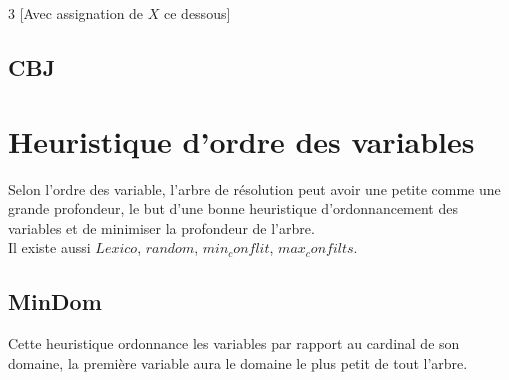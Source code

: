 \begin{multicols}{3}
[Avec assignation de $X$ ce dessous]
\end{multicols}
\pagebreak

\subsection{CBJ}


\section{Heuristique d'ordre des variables}

Selon l'ordre des variable, l'arbre de résolution peut avoir une petite comme une grande profondeur, le but d'une bonne heuristique d'ordonnancement des variables et de minimiser la profondeur de l'arbre.\\
Il existe aussi $Lexico$, $random$, $min_conflit$, $max_confilts$.\\

\subsection{ MinDom}
Cette heuristique ordonnance les variables par rapport au cardinal de son domaine, la première variable aura le domaine le plus petit de tout l'arbre.

